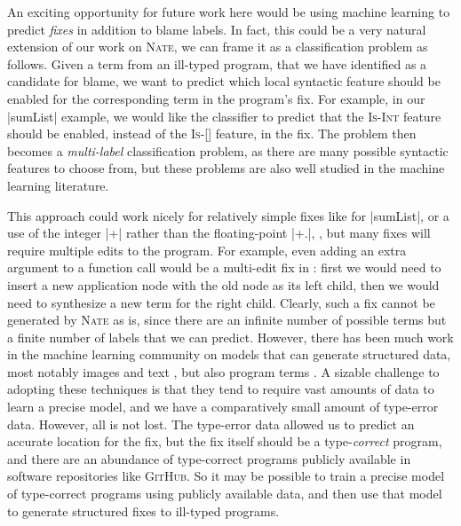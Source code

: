 An exciting opportunity for future work here would be using machine
learning to predict \emph{fixes} in addition to blame labels.
%
In fact, this could be a very natural extension of our work on
\textsc{Nate}, we can frame it as a classification problem as follows.
%
Given a term from an ill-typed program, that we have identified as a
candidate for blame, we want to predict which local syntactic feature
should be enabled for the corresponding term in the program's fix.
%
For example, in our |sumList| example, we would like the classifier to
predict that the \textsc{Is-Int} feature should be enabled, instead of
the \textsc{Is-[]} feature, in the fix.
%
The problem then becomes a \emph{multi-label} classification problem, as
there are many possible syntactic features to choose from, but these
problems are also well studied in the machine learning literature.

This approach could work nicely for relatively simple fixes like for
|sumList|, or a use of the integer |+| rather than the floating-point
|+.|, \etc, but many fixes will require multiple edits to the program.
%
For example, even adding an extra argument to a function call would be a
multi-edit fix in \ocaml: first we would need to insert a new
application node with the old node as its left child, then we would need
to synthesize a new term for the right child.
%
Clearly, such a fix cannot be generated by \textsc{Nate} as is, since
there are an infinite number of possible terms but a finite number of
labels that we can predict.
%
However, there has been much work in the machine learning community on
models that can generate structured data, most notably images 
and text , but also program terms
\citep[see, \eg][]{Raychev2016-xk,Raychev2014-jv}.
%
A sizable challenge to adopting these techniques is that they tend to
require vast amounts of data to learn a precise model, and we have a
comparatively small amount of type-error data.
%
However, all is not lost.
%
The type-error data allowed us to predict an accurate location for the
fix, but the fix itself should be a type-\emph{correct} program, and
there are an abundance of type-correct programs publicly available in
software repositories like \textsc{GitHub}.
%
So it may be possible to train a precise model of type-correct programs
using publicly available data, and then use that model to generate
structured fixes to ill-typed programs.




